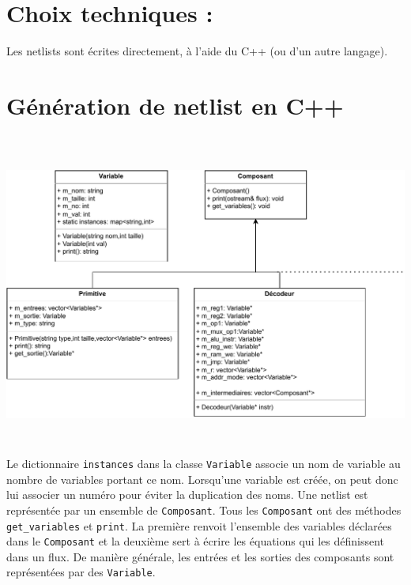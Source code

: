\documentclass{article}
\begin{document}
    \section{Choix techniques :}
    Les netlists sont écrites directement, à l'aide du C++ (ou d'un autre langage).
		\section{Génération de netlist en C++}
		\includegraphics[width=14.8cm,height=10.6cm,page=1]{uml.pdf}\\
		Le dictionnaire \texttt{instances} dans la classe \texttt{Variable} associe un nom de variable au nombre de variables portant ce nom. Lorsqu'une variable est créée, on peut donc lui associer un numéro pour éviter la duplication des noms. Une netlist est représentée par un ensemble de \texttt{Composant}. Tous les \texttt{Composant} ont des méthodes \texttt{get\_variables} et \texttt{print}. La première renvoit l'ensemble des variables déclarées dans le \texttt{Composant} et la deuxième sert à écrire les équations qui les définissent dans un flux. De manière générale, les entrées et les sorties des composants sont représentées par des \texttt{Variable}.
		\newpage
\end{document}
